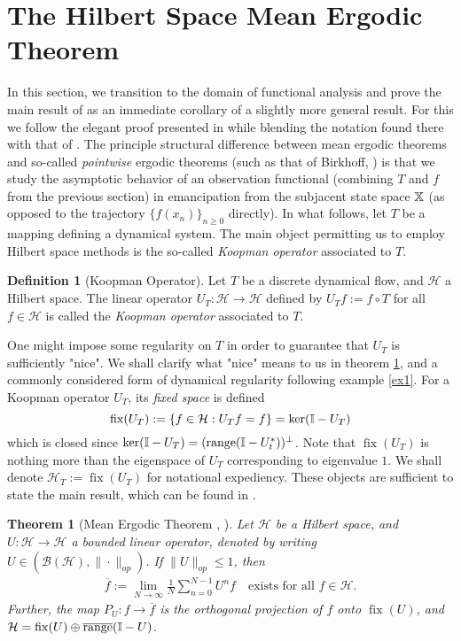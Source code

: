 \documentclass[11pt]{report}
\newcommand{\mc}[1]{\mathcal{#1}}
\newcommand{\1}[1]{\mathbbm{1}_{\{#1\}}}
\DeclareMathOperator{\fix}{fix}
\DeclareMathOperator{\ran}{range}
\newtheorem{theorem}{Theorem}[section]
\theoremstyle{definition}
\newtheorem{definition}{Definition}
\begin{document}
    \section{The Hilbert Space Mean Ergodic Theorem}\label{sec2}
    In this section, we transition to the domain of functional analysis and
    prove the main result of \cite{Neumann_1932} as an immediate corollary of a
    slightly more general result. For this we follow the elegant proof presented
    in \cite[theorem 1.3.1]{Weber_2000} while blending the notation found there
    with that of \cite[ch.8]{Eisner_Farkas_Haase_Nagel_2015}. The principle
    structural difference between mean ergodic theorems and so-called
    \textit{pointwise} ergodic theorems (such as that of Birkhoff,
    \cite{Birkhoff_1931}) is that we study the asymptotic behavior of an
    observation functional (combining $T$ and $f$ from the previous section) in
    emancipation from the subjacent state space $\mathbb{X}$ (as opposed to the
    trajectory $\{f(x_n)\}_{n\geq 0}$ directly). In what follows, let $T$ be a
    mapping defining a dynamical system. The main object permitting us to employ
    Hilbert space methods is the so-called {\it Koopman operator} associated to
    $T$.
    \begin{definition}[Koopman Operator]\label{def1} Let $T$ be a discrete
        dynamical flow, and $\mc{H}$ a Hilbert space. The linear operator
        $U_T:\mc{H}\rightarrow \mc{H}$ defined by $U_Tf:=f\circ T$ for all $f\in
        \mc{H}$ is called the \textit{Koopman operator} associated to $T$.
    \end{definition}
    One might impose some regularity on $T$ in order to guarantee that $U_T$ is
    sufficiently "nice". We shall clarify what "nice" means to us in theorem
    \ref{thm1}, and a commonly considered form of dynamical regularity following
    example \ref{ex1}. For a Koopman operator $U_T$, its \textit{fixed space} is
    defined
    \[\fix(U_T):=\{f\in\mc{H}:U_Tf=f\}=\ker(\mbb{I}-U_T)\]
    which is closed since $\ker(\mbb{I}-U_T)=(\ran(\mbb{I}-U_t^\ast))^{\perp}$.
    Note that $\fix(U_T)$ is nothing more than the eigenspace of $U_T$
    corresponding to eigenvalue $1$. We shall denote $\mc{H}_T:=\fix(U_T)$ for
    notational expediency. These objects are sufficient to state the main
    result, which can be found in \cite[theorem
    8.6]{Eisner_Farkas_Haase_Nagel_2015}.
    \begin{theorem}[Mean Ergodic Theorem {\cite[theorem
        8.6]{Eisner_Farkas_Haase_Nagel_2015}}, {\cite[theorem
        1.3.1]{Weber_2000}}]\label{thm1} Let $\mc{H}$ be a Hilbert space, and
        $U:\mc{H}\rightarrow\mc{H}$ a bounded linear operator, denoted by writing
        $U\in(\mc{B}(\mc{H}),\|\cdot\|_{op})$. If $\|U\|_{op}\leq 1$, then
        \begin{align*}
            \overline{f}:=\lim_{N\rightarrow\infty}\frac{1}{N}\sum_{n=0}^{N-1}U^nf\quad\text{exists for all $f\in\mc{H}$.}
        \end{align*}
        Further, the map $P_{U}:f\rightarrow\overline{f}$ is the orthogonal
        projection of $f$ onto $\fix(U)$, and
        $\mc{H}=\fix(U)\oplus\overline{\ran}(\mbb{I}-U)$.
    \end{theorem}
\end{document}
